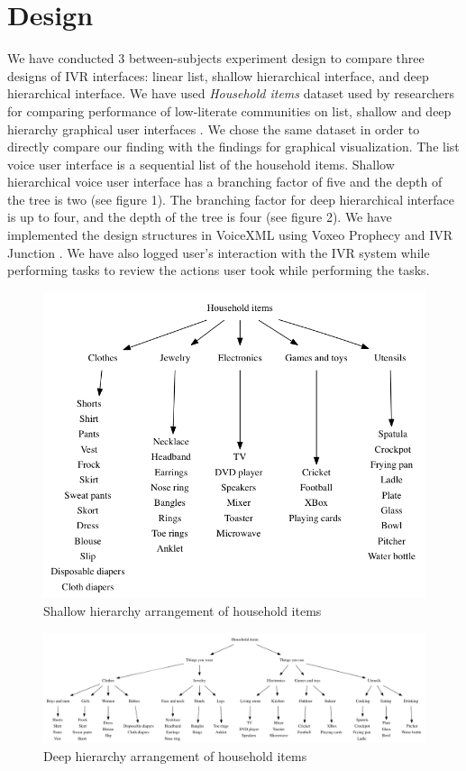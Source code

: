 \documentclass{sigchi}
\begin{document}
\section{Design}
We have conducted 3 between-subjects experiment design to compare three designs of IVR interfaces: linear list, shallow hierarchical interface, and deep hierarchical interface. We have used \textit{Household items} dataset used by researchers for comparing performance of low-literate communities on list, shallow and deep hierarchy graphical user interfaces \cite{Medhi2013a,Medhi2013b}. We chose the same dataset in order to directly compare our finding with the findings for graphical visualization. The list voice user interface is a sequential list of the household items. Shallow hierarchical voice user interface has a branching factor of five and the depth of the tree is two (see figure 1). The branching factor for deep hierarchical interface is up to four, and the depth of the tree is four (see figure 2). We have implemented the design structures in VoiceXML using Voxeo Prophecy and IVR Junction \cite{Vashistha}. We have also logged user's interaction with the IVR system while performing tasks to review the actions user took while performing the tasks.

\begin{figure}[!h]
\centering
\includegraphics[width=0.9\columnwidth]{ShallowHierarchy}
\caption{Shallow hierarchy arrangement of household items}
\label{fig: Figure1}
\end{figure}

\begin{figure}[!h]
\centering
\includegraphics[width=0.9\columnwidth]{DeepHierarchy}
\caption{Deep hierarchy arrangement of household items}
\label{fig: Figure2}
\end{figure}
\end{document}
